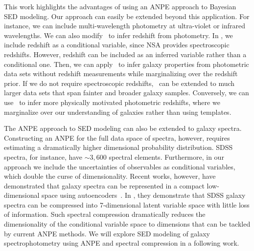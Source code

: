 This work highlights the advantages of using an ANPE approach to Bayesian SED
modeling. 
Our approach can easily be extended beyond this application. 
For instance, we can include multi-wavelength photometry at ultra-violet or
infrared wavelengths. 
We can also modify \sedflow~to infer redshift from photometry. 
In \sedflow, we include redshift as a conditional variable, since NSA provides
spectroscopic redshifts. 
However, redshift can be included as an inferred variable rather than a
conditional one. 
Then, we can apply \sedflow~to infer galaxy properties from photometric data
sets without redshift measurements while marginalizing over the redshift
prior. 
If we do not require spectroscopic redshifts, \sedflow~can be extended to much
larger data sets that span fainter and broader galaxy samples. 
Conversely, we can use \sedflow~to infer more physically motivated photometric 
redshifts, where we marginalize over our understanding of galaxies rather than
using templates. 

The ANPE approach to SED modeling can also be extended to galaxy spectra. 
Constructing an ANPE for the full data space of spectra, however, requires
estimating a dramatically higher dimensional probability distribution. 
SDSS spectra, for instance, have ${\sim}3,600$ spectral elements.  
Furthermore, in our approach we include the uncertainties of observables as
conditional variables, which double the curse of dimensionality.
Recent works, however, have demonstrated that galaxy spectra can be represented
in a compact low-dimensional space using autoencoders~\citep[][Melchior \&
Hahn, in prep.]{portillo2020}.
In \cite{portillo2020}, they demonstrate that SDSS galaxy spectra can be
compressed into 7-dimensional latent variable space with little loss of
information. 
Such spectral compression dramatically reduces the dimensionality of the
conditional variable space to dimensions that can be tackled by current ANPE
methods. 
We will explore SED modeling of galaxy spectrophotometry using ANPE and
spectral compression in a following work. 




